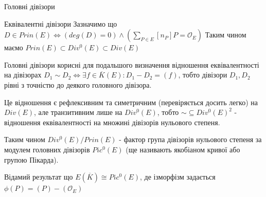 \documentclass[9pt]{beamer}
\begin{document}
\begin{darkframes}
\begin{frame}{Головні дівізори}
    
\end{frame}

\begin{frame}{Еквівалентні дівізори}
    Зазначимо що $D\in Prin(E) \iff (deg(D)=0) \land (\sum_{P\in E} [n_P] P = \mathcal{O}_E) $
    Таким чином маємо $Prin(E) \subset Div^0(E) \subset Div(E)$

    Головні дівізори корисні для подальшого визначення відношення еквівалентності на дівізорах $D_1\sim D_2 \iff \exists f \in \overline{K}(E): D_1-D_2=(f)$, тобто дівізори $D_1, D_2$ рівні з точністю до деякого головного дівізора.

    Це відношення є рефлексивним та симетричним (перевіряється досить легко) на $Div(E)$, але транзитивним лише на $Div^0(E)$, тобто $\sim \subseteq Div^0(E)^2$ - відношення еквівалентності на множині дівізорів нульового степеня.

    Таким чином $Div^0(E)/Prin(E)$ - фактор група дівізорів нульового степеня за модулем головних дівізорів $Pic^0(E)$ (ще називають якобіаном кривої або групою Пікарда).

    Відамий результат що $E(\overline{K}) \cong Pic^0(E)$, де ізморфізм задається $\phi(P) = (P)-(\mathcal{O}_E) $
    
\end{frame}

  \end{darkframes}
\end{document}
